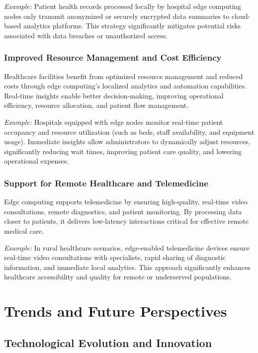 \documentclass[runningheads]{llncs}
\begin{document}
\textit{Example:} Patient health records processed locally by hospital edge computing nodes only transmit anonymized or securely encrypted data summaries to cloud-based analytics platforms. This strategy significantly mitigates potential risks associated with data breaches or unauthorized access.

\subsubsection{Improved Resource Management and Cost Efficiency}
Healthcare facilities benefit from optimized resource management and reduced costs through edge computing’s localized analytics and automation capabilities. Real-time insights enable better decision-making, improving operational efficiency, resource allocation, and patient flow management.

\textit{Example:} Hospitals equipped with edge nodes monitor real-time patient occupancy and resource utilization (such as beds, staff availability, and equipment usage). Immediate insights allow administrators to dynamically adjust resources, significantly reducing wait times, improving patient care quality, and lowering operational expenses.

\subsubsection{Support for Remote Healthcare and Telemedicine}
Edge computing supports telemedicine by ensuring high-quality, real-time video consultations, remote diagnostics, and patient monitoring. By processing data closer to patients, it delivers low-latency interactions critical for effective remote medical care.

\textit{Example:} In rural healthcare scenarios, edge-enabled telemedicine devices ensure real-time video consultations with specialists, rapid sharing of diagnostic information, and immediate local analytics. This approach significantly enhances healthcare accessibility and quality for remote or underserved populations.


\section{Trends and Future Perspectives}

\subsection{Technological Evolution and Innovation}
\end{document}
